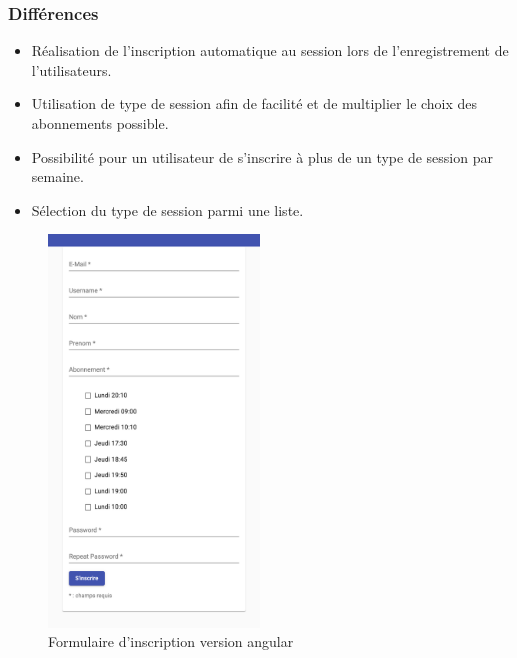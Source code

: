 \subsubsection{Différences}
	\begin{itemize}
		\item Réalisation de l'inscription automatique au session lors de l'enregistrement de l'utilisateurs. 
		\item Utilisation de type de session afin de facilité et de multiplier le choix des abonnements possible. 
		\item Possibilité pour un utilisateur de s'inscrire à plus de un type de session par semaine. 
		\item Sélection du type de session parmi une liste. 
	\end{itemize}

	\begin{figure}[h!]
		\includegraphics[width = 0.5\textwidth,center]{Figures/us4-1-angular}
		\caption{Formulaire d'inscription version angular}
	\end{figure}
	
	
\newpage

